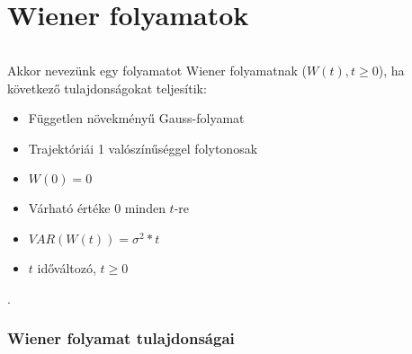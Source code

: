 \documentclass[11pt,a4paper]{article}
\begin{document}
		\part{Wiener folyamatok}
			\paragraph{}
				Akkor nevezünk egy folyamatot Wiener folyamatnak ($W(t), t\ge 0$), ha következő tulajdonságokat teljesítik:
				\begin{itemize}
					\item Független növekményű Gauss-folyamat
					\item Trajektóriái 1 valószínűséggel folytonosak
					\item $W(0) = 0$
					\item Várható értéke 0 minden $t$-re
					\item $VAR(W(t)) = \sigma^2 * t$
					\item $t$ időváltozó, $t \ge 0$
				\end{itemize}.
			\section{Wiener folyamat tulajdonságai}
\end{document}
